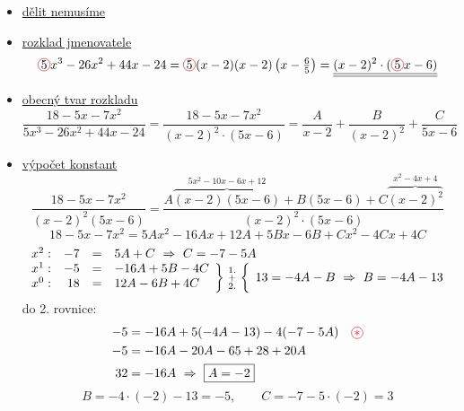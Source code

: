 \documentclass[11pt,a4paper]{article}
\newcommand{\hornerlines}[4]{%
  \pgfmathtruncatemacro{\hlR}{#2-1}\pgfmathtruncatemacro{\hlN}{#3-1}%
  \foreach \i in {1,...,\hlR} \draw (#1-\i-1.south west) -- (#1-\i-#3.south east);
  \foreach \j in {1,...,\hlN} \draw (#1-1-\j.north east) -- (#1-#2-\j.south east);
  \draw[decorate, decoration={brace, mirror, amplitude=4pt}]
    ([yshift=-2pt]#1-#2-2.south west) -- ([yshift=-2pt]#1-#2-#4.south east);}
\newcommand{\tm}[2]{\tikz[remember picture, baseline=(#1.base)]\node[inner sep=0pt, outer sep=1pt] (#1) {$\displaystyle #2$};}
\newcommand{\kr}[1]{\tikz[baseline=(k.base)]\node[draw=red!75!black, circle, inner sep=0.6pt] (k) {$#1$};}
\newcommand{\hv}{\tikz[baseline=(k.base)]\node[draw=red!75!black, text=red!75!black, circle, inner sep=0.8pt] (k) {$\ast$};}
\newcommand{\spoj}[2]{\raisebox{-7.2pt}[0pt][0pt]{$\left.\vphantom{\rule[-9.3pt]{0pt}{24pt}}\right\}#1\left\{\vphantom{\rule[-9.3pt]{0pt}{24pt}}\right.#2$}}
\begin{document}
\begin{itemize}
\item \underline{dělit nemusíme}
\item \underline{rozklad jmenovatele}
\[
\kr{5}x^3-26x^2+44x-24 = \kr{5}(x-2)(x-2)\left(x-\tfrac65\right) = \underline{\underline{(x-2)^2\cdot(\kr{5}x-6)}}
\]
\begin{center}
\end{center}
\item \underline{obecný tvar rozkladu}
\[
\frac{18-5x-7x^2}{5x^3-26x^2+44x-24} = \frac{18-5x-7x^2}{(x-2)^2\cdot(5x-6)} = \frac{A}{x-2}+\frac{B}{(x-2)^2}+\frac{C}{5x-6}
\]
\item \underline{výpočet konstant}
\[
\frac{18-5x-7x^2}{(x-2)^2(5x-6)} = \frac{A\overbrace{(x-2)(5x-6)}^{5x^2-10x-6x+12}+B(5x-6)+C\overbrace{(x-2)^2}^{x^2-4x+4}}{(x-2)^2\cdot(5x-6)}
\]
\[
18-5x-7x^2 = 5Ax^2-16Ax+12A+5Bx-6B+Cx^2-4Cx+4C
\]
\[
\begin{array}{lrcl}
x^2: & -7 &=& 5A+C \ \Rightarrow\ \tm{Cv}{C=-7-5A}\\
x^1: & -5 &=& -16A+5B-4C\ \spoj{\begin{smallmatrix}1.\\+\\2.\end{smallmatrix}}{\,13=-4A-B \ \Rightarrow\ \tm{Bv}{B=-4A-13}}\\
x^0: & 18 &=& 12A-6B+4C
\end{array}
\]
do 2. rovnice:
\begin{align*}
-5 &= -16A+5\tm{sB}{(-4A-13)}-4\tm{sC}{(-7-5A)} \quad \hv\\
-5 &= -16A-20A-65+28+20A\\
32 &= -16A \ \Rightarrow\ \boxed{A=-2}
\end{align*}
\[
\boxed{B}=-4\cdot(-2)-13=\boxed{-5}, \qquad \boxed{C}=-7-5\cdot(-2)=\boxed{3}
\]
\end{itemize}
\end{document}
